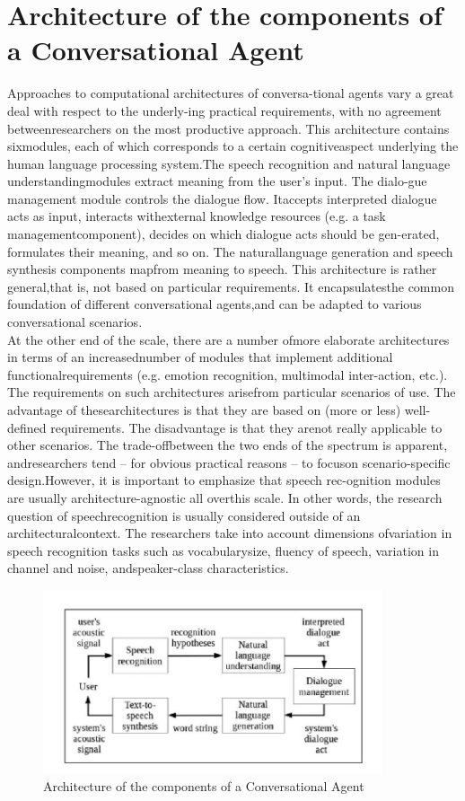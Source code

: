 \section{Architecture of the components of a Conversational Agent}
Approaches to computational architectures of conversa-tional agents vary a great deal with respect to the underly-ing practical requirements, with no agreement betweenresearchers on the most productive approach. This architecture contains sixmodules, each of which corresponds to a certain cognitiveaspect underlying the human language processing system.The speech recognition and natural language understandingmodules extract meaning from the user’s input. The dialo-gue management module controls the dialogue flow. Itaccepts interpreted dialogue acts as input, interacts withexternal knowledge resources (e.g. a task managementcomponent), decides on which dialogue acts should be gen-erated, formulates their meaning, and so on. The naturallanguage generation and speech synthesis components mapfrom meaning to speech. This architecture is rather general,that is, not based on particular requirements. It encapsulatesthe common foundation of different conversational agents,and can be adapted to various conversational scenarios.\\At the other end of the scale, there are a number ofmore elaborate architectures in terms of an increasednumber of modules that implement additional functionalrequirements (e.g. emotion recognition, multimodal inter-action, etc.). The requirements on such architectures arisefrom particular scenarios of use. The advantage of thesearchitectures is that they are based on (more or less) well-defined requirements. The disadvantage is that they arenot really applicable to other scenarios. The trade-offbetween the two ends of the spectrum is apparent, andresearchers tend – for obvious practical reasons – to focuson scenario-specific design.However, it is important to emphasize that speech rec-ognition modules are usually architecture-agnostic all overthis scale. In other words, the research question of speechrecognition is usually considered outside of an architecturalcontext. The researchers take into account dimensions ofvariation in speech recognition tasks such as vocabularysize, fluency of speech, variation in channel and noise, andspeaker-class characteristics.

\begin{figure}[h]
	\begin{center}
		\includegraphics[width =10cm]{7.PNG}
		\caption{Architecture of the components of a Conversational Agent}
		\label{ab}
	\end{center}
\end{figure}


